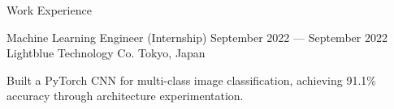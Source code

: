 \begin{rSection}{Work Experience}
    \begin{rWorkExperienceSubsection}
        {Machine Learning Engineer (Internship)}
        {September 2022 --- September 2022}
        {Lightblue Technology Co.}
        {Tokyo, Japan}
        {
            \item Built a PyTorch CNN for multi-class image classification, achieving 91.1\% accuracy through architecture experimentation.
        }
    \end{rWorkExperienceSubsection}

\end{rSection}
